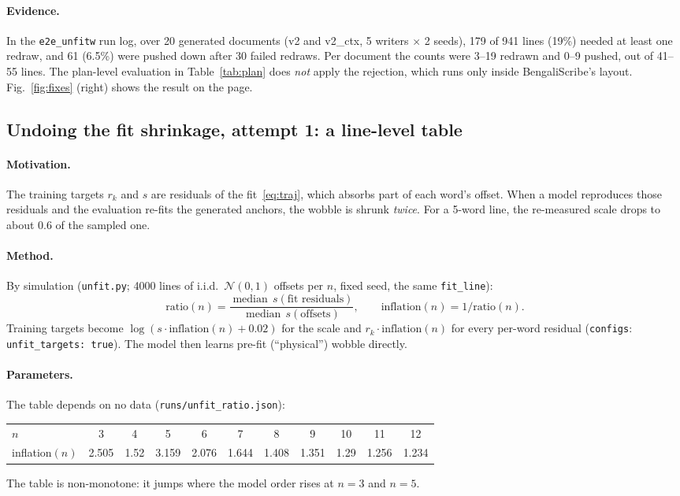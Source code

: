 \documentclass[11pt,a4paper]{article}
\newcommand{\src}[1]{{\footnotesize\texttt{#1}}}
\begin{document}
\paragraph{Evidence.} In the \texttt{e2e\_unfitw} run log, over 20 generated
documents (v2 and v2\_ctx, 5 writers $\times$ 2 seeds), 179 of 941 lines
(19\%) needed at least one redraw, and 61 (6.5\%) were pushed down after 30
failed redraws. Per document the counts were 3--19 redrawn and 0--9 pushed,
out of 41--55 lines.
The plan-level evaluation in Table~\ref{tab:plan} does \emph{not} apply the
rejection, which runs only inside BengaliScribe's layout. Fig.~\ref{fig:fixes}
(right) shows the result on the page.

\subsection{Undoing the fit shrinkage, attempt 1: a line-level table}
\label{sec:unfit}
\paragraph{Motivation.} The training targets $r_k$ and $s$ are residuals of the
fit~\eqref{eq:traj}, which absorbs part of each word's offset. When a model
reproduces those residuals and the evaluation re-fits the generated anchors,
the wobble is shrunk \emph{twice}. For a 5-word line, the re-measured scale
drops to about 0.6 of the sampled one.

\paragraph{Method.} By simulation (\texttt{unfit.py}; 4000 lines of i.i.d.\
$\mathcal N(0,1)$ offsets per $n$, fixed seed, the same \texttt{fit\_line}):
\begin{equation}
\text{ratio}(n)=\frac{\operatorname{median}\,s(\text{fit residuals})}
{\operatorname{median}\,s(\text{offsets})},\qquad
\text{inflation}(n)=1/\text{ratio}(n).
\end{equation}
Training targets become $\log(s\cdot\text{inflation}(n)+0.02)$ for the scale
and $r_k\cdot\text{inflation}(n)$ for every per-word residual
(\texttt{configs}: \texttt{unfit\_targets: true}). The model then learns
pre-fit (``physical'') wobble directly.

\paragraph{Parameters.} The table depends on no data
(\src{runs/unfit\_ratio.json}):
\begin{center}
\begin{tabular}{lcccccccccc}
\toprule
$n$ & 3 & 4 & 5 & 6 & 7 & 8 & 9 & 10 & 11 & 12\\
inflation$(n)$ & 2.505 & 1.52 & 3.159 & 2.076 & 1.644 & 1.408 & 1.351 & 1.29 & 1.256 & 1.234\\
\bottomrule
\end{tabular}
\end{center}
The table is non-monotone: it jumps where the model order rises at $n=3$ and $n=5$.
\end{document}
